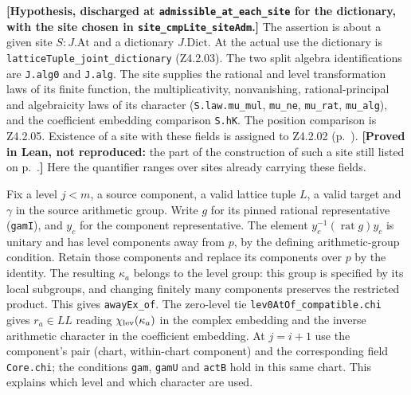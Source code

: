 \noindent\textbf{[Hypothesis, discharged at \nolinkurl{admissible_at_each_site} for the dictionary, with the site chosen in \nolinkurl{site_cmpLite_siteAdm}.]}
The assertion is about a given site \(S:J.\mathrm{At}\) and a dictionary
\(J.\mathrm{Dict}\). At the actual use the dictionary is
\nolinkurl{latticeTuple_joint_dictionary} (Z4.2.03). The two split
algebra identifications are \nolinkurl{J.alg0} and \nolinkurl{J.alg}.
The site supplies the rational and level transformation laws of its finite
function, the multiplicativity, nonvanishing, rational-principal and
algebraicity laws of its character (\nolinkurl{S.law.mu_mul},
\nolinkurl{mu_ne}, \nolinkurl{mu_rat}, \nolinkurl{mu_alg}), and the
coefficient embedding comparison \nolinkurl{S.hK}. The position
comparison is Z4.2.05. Existence of a site with these fields is assigned
to Z4.2.02 (p.~\pageref{r8:Z4.2.02}).
\textbf{[Proved in Lean, not reproduced:} the part of the construction
of such a site still listed on p.~\pageref{r8:Z4.2.02}.\textbf{]}
Here the quantifier ranges over sites already carrying these fields.

Fix a level \(j<m\), a source component, a valid lattice tuple \(L\), a
valid target and \(\gamma\) in the source arithmetic group. Write \(g\)
for its pinned rational representative (\nolinkurl{gamI}), and \(y_c\)
for the component representative. The element
\(y_c^{-1}(\operatorname{rat}g)y_c\) is unitary and has level
components away from \(p\), by the defining arithmetic-group condition.
Retain those components and replace its components over \(p\) by the
identity. The resulting \(\kappa_a\) belongs to the level group: this
group is specified by its local subgroups, and changing finitely many
components preserves the restricted product. This gives
\nolinkurl{awayEx_of}. The zero-level tie
\nolinkurl{lev0AtOf_compatible.chi} gives \(r_a\in LL\) reading
\(\chi_{\rm lev}(\kappa_a)\) in the complex embedding and the
inverse arithmetic character in the coefficient embedding. At
\(j=i+1\) use the component's pair (chart, within-chart component)
and the corresponding field \nolinkurl{Core.chi}; the conditions
\nolinkurl{gam}, \nolinkurl{gamU} and \nolinkurl{actB} hold in this
same chart. This explains which level and which character are used.

